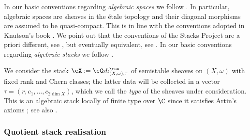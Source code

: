 In our basic conventions regarding \emph{algebraic spaces} we follow \cite[\S2]{Alper13}. In particular, algebraic spaces are sheaves in the étale topology and their diagonal morphisms are assumed to be quasi-compact. This is in line with the conventions adopted in Knutson's book \cite{Knutson}. We point out that the conventions of the Stacks Project are a priori different, see \cite[\href{https://stacks.math.columbia.edu/tag/025X}{Tag\,025X}]{stacks-project}, but eventually equivalent, see \cite[\href{https://stacks.math.columbia.edu/tag/076L}{Tag\,076L}]{stacks-project}. In our basic conventions regarding \emph{algebraic stacks} we follow \cite{stacks-project}.

We consider the stack $\cX:=\cC\!oh_{(X,\omega),\tau}^{{\rss}}$ of semistable sheaves on $(X,\omega)$ with fixed rank and Chern classes; the latter data will be collected in a vector $\tau=(r, c_1, \dots, c_{2\dim X})$, which we call the \emph{type} of the sheaves under consideration. This is an algebraic stack locally of finite type over $\C$ since it satisfies Artin's axioms \cite[Th.\,2.20]{Alper}; see also \cite[Th.\,2.19]{AlperHR}.

\subsubsection{Quotient stack realisation}\label{subsubsect:quotient_realisation}

